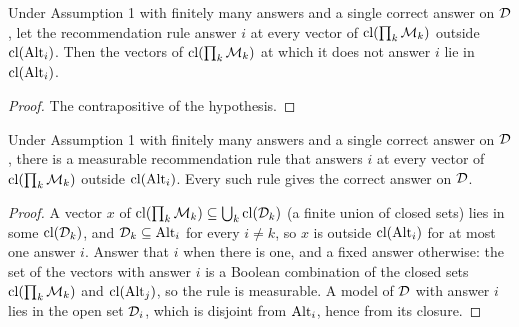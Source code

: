 \begin{lemma}
  \label{lem:error_set_subset}
  Under Assumption 1 with finitely many answers and a single correct answer on $\mathcal{D}$, let the
  recommendation rule answer $i$ at every vector of $\mathrm{cl}(\prod_k \mathcal{M}_k)$ outside
  $\mathrm{cl}(\mathrm{Alt}_i)$. Then the vectors of $\mathrm{cl}(\prod_k \mathcal{M}_k)$ at which it does not answer $i$ lie in
  $\mathrm{cl}(\mathrm{Alt}_i)$.
\end{lemma}

\begin{proof}
  The contrapositive of the hypothesis.
\end{proof}

\begin{lemma}
  \label{lem:exists_rec}
  \leanok
  Under Assumption 1 with finitely many answers and a single correct answer on $\mathcal{D}$, there is a
  measurable recommendation rule that answers $i$ at every vector of $\mathrm{cl}(\prod_k \mathcal{M}_k)$ outside
  $\mathrm{cl}(\mathrm{Alt}_i)$. Every such rule gives the correct answer on $\mathcal{D}$.
\end{lemma}

\begin{proof}
  \leanok
  A vector $x$ of $\mathrm{cl}(\prod_k \mathcal{M}_k) \subseteq \bigcup_k \mathrm{cl}(\mathcal{D}_k)$ (a finite union of closed
  sets) lies in some $\mathrm{cl}(\mathcal{D}_k)$, and $\mathcal{D}_k \subseteq \mathrm{Alt}_i$ for every $i \ne k$, so $x$ is
  outside $\mathrm{cl}(\mathrm{Alt}_i)$ for at most one answer $i$. Answer that $i$ when there is one, and a fixed
  answer otherwise: the set of the vectors with answer $i$ is a Boolean combination of the closed
  sets $\mathrm{cl}(\prod_k \mathcal{M}_k)$ and $\mathrm{cl}(\mathrm{Alt}_j)$, so the rule is measurable. A model of $\mathcal{D}$ with
  answer $i$ lies in the open set $\mathcal{D}_i$, which is disjoint from $\mathrm{Alt}_i$, hence from its
  closure.
\end{proof}
